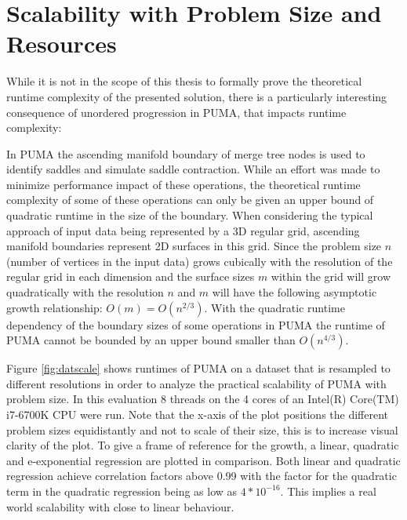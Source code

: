 \documentclass[%
	paper=A4,					%
	twoside=true,				%
	openright,					%
	parskip=full,				%
	chapterprefix=true,			%
	11pt,						%
	headings=normal,			%
	bibliography=totoc,			%
	listof=totoc,				%
	titlepage=on,				%
	captions=tableabove,		%
	draft=false,				%
]{scrreprt}%
\begin{document}
\section{Scalability with Problem Size and Resources}
While it is not in the scope of this thesis to formally prove the theoretical runtime complexity of the presented solution, there is a particularly interesting consequence of unordered progression in PUMA, that impacts runtime complexity:

In PUMA the ascending manifold boundary of merge tree nodes is used to identify saddles and simulate saddle contraction. While an effort was made to minimize performance impact of these operations, the theoretical runtime complexity of some of these operations can only be given an upper bound of quadratic runtime in the size of the boundary. When considering the typical approach of input data being represented by a 3D regular grid, ascending manifold boundaries represent 2D surfaces in this grid. Since the problem size \(n\) (number of vertices in the input data) grows cubically with the resolution of the regular grid in each dimension and the surface sizes \(m\) within the grid will grow quadratically with the resolution \(n\) and \(m\) will have the following asymptotic growth relationship: \(O(m) =O(n^{2/3})\). With the quadratic runtime dependency of the boundary sizes of some operations in PUMA the runtime of PUMA cannot be bounded by an upper bound smaller than \(O(n^{4/3})\).

Figure \ref{fig:datscale} shows runtimes of PUMA on a dataset that is resampled to different resolutions in order to analyze the practical scalability of PUMA with problem size. In this evaluation 8 threads on the 4 cores of an Intel(R) Core(TM) i7-6700K CPU were run. Note that the x-axis of the plot positions the different problem sizes equidistantly and not to scale of their size, this is to increase visual clarity of the plot. To give a frame of reference for the growth, a linear, quadratic and e-exponential regression are plotted in comparison. Both linear and quadratic regression achieve correlation factors above 0.99 with the factor for the quadratic term in the quadratic regression being as low as \(4*10^{-16}\). This implies a real world scalability with close to linear behaviour.
\end{document}
